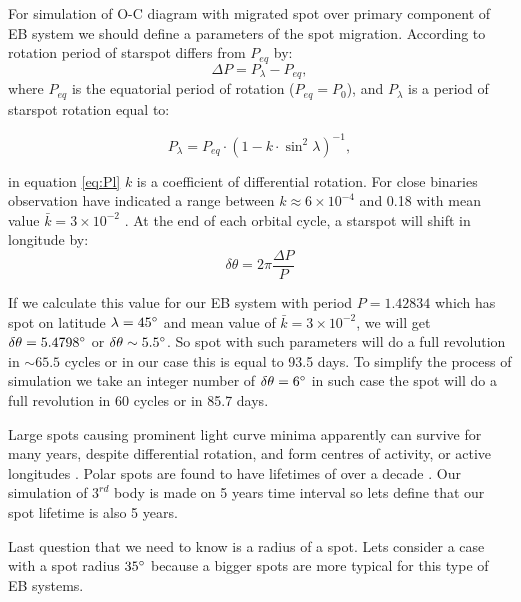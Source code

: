 For simulation of O-C diagram with migrated spot over primary component of EB system we should define a parameters of the spot migration. 
According to \cite{Kalimeris2002} rotation period of starspot differs from $P_{eq}$ by:
\begin{equation}
\Delta P = P_\lambda-P_{eq},  %
\end{equation} 
where $P_{eq}$ is the equatorial period of rotation ($P_{eq}=P_0$), and $P_{\lambda}$ is a period of starspot rotation equal to:

\begin{equation}
P_\lambda = P_{eq} \cdot (1-k \cdot \sin^{2}\lambda)^{-1}, 
\label{eq:Pl}
\end{equation} 

in equation \ref{eq:Pl} $k$ is a coefficient of differential rotation. For close binaries observation have indicated a range between 
$k\approx 6 \times10^{-4}$ and 0.18 with mean value $\bar{k}=3 \times10^{-2}$ \citep{Hall1990}. At the end of each orbital cycle, a starspot will shift  in longitude by: 
\begin{equation}
\delta \theta = 2\pi \frac{\Delta P}{P}
\end{equation}

If we calculate this value for our EB system with period $P=1.42834$ which has spot on latitude $\lambda=45\degree$ and mean value of $\bar{k}=3 \times10^{-2}$, we will get $\delta \theta = 5.4798\degree$ or $\delta \theta \sim 5.5\degree$. So spot with such parameters will do a full revolution in $\sim 65.5$ cycles or in our case this is equal to 93.5 days. To simplify the process of simulation we take an integer number of $\delta \theta = 6\degree$ in such case the spot will do a full revolution in 60 cycles or in 85.7 days. 

Large spots causing prominent light curve minima apparently can survive for many years, despite differential rotation, and form centres
of activity, or active longitudes \citep{Berdyugina2005}. Polar spots are found to have lifetimes of over a decade \citep{Hussain2002}.
Our simulation of $3^{rd}$ body is made on 5 years time interval so lets define that our spot lifetime is also 5 years.

Last question that we need to know is a radius of a spot. Lets consider a case with a spot radius $35\degree$ because a bigger spots are more typical for this type of EB systems. 

